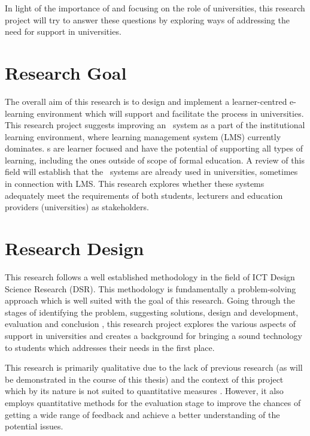 In light of the importance of \LLLs and focusing on the role of universities,
this research project will try to answer these questions by exploring ways
of addressing the need for \LLLs support in universities.

\section{Research Goal}

The overall aim of this research is to design and implement a learner-centred
e-learning environment which will support and facilitate the \LLLs process in
universities. This research project suggests improving an \ep~system as a part
of the institutional learning environment, where learning management system
(LMS) currently dominates. \ep s are learner focused and have the potential of
supporting all types of learning, including the ones outside of scope of formal
education. A review of this field will establish that the \ep~systems are
already used in universities, sometimes in connection with LMS. This research
explores whether these systems adequately meet the requirements of both
students, lecturers and education providers (universities) as \LLLs
stakeholders.

\section{Research Design}

This research follows a well established methodology in the field of ICT Design
Science Research (DSR). This methodology is fundamentally a problem-solving
approach \citep{Cross1993} which is well suited with the goal of this research.
Going through the stages of identifying the problem, suggesting solutions,
design and development, evaluation and conclusion
\citep{Peffers2008,Vaishnavi2007}, this research project explores the various
aspects of \LLLs support in universities and creates a background for bringing a
sound technology to students which addresses their needs in the first place.

This research is primarily qualitative due to the lack of previous research (as
will be demonstrated in the course of this thesis) and the \LLLs context of this
project which by its nature is not suited to quantitative measures
\citep{Creswell2009}. However, it also employs quantitative methods for the 
evaluation stage to improve the chances of getting a wide range of feedback and
achieve a better understanding of the potential issues.

